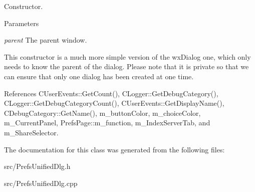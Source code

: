 Constructor. 
\begin{DoxyParams}{Parameters}
\item[{\em parent}]The parent window.\end{DoxyParams}
This constructor is a much more simple version of the wxDialog one, which only needs to know the parent of the dialog. Please note that it is private so that we can ensure that only one dialog has been created at one time. 

References CUserEvents::GetCount(), CLogger::GetDebugCategory(), CLogger::GetDebugCategoryCount(), CUserEvents::GetDisplayName(), CDebugCategory::GetName(), m\_\-buttonColor, m\_\-choiceColor, m\_\-CurrentPanel, PrefsPage::m\_\-function, m\_\-IndexServerTab, and m\_\-ShareSelector.

The documentation for this class was generated from the following files:\begin{DoxyCompactItemize}
\item 
src/PrefsUnifiedDlg.h\item 
src/PrefsUnifiedDlg.cpp\end{DoxyCompactItemize}
